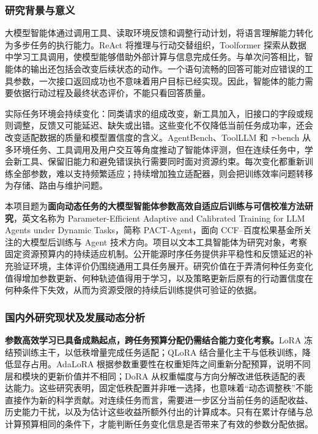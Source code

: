 \justifying
\NSFCBodyText

\subsubsection{研究背景与意义}

大模型智能体通过调用工具、读取环境反馈和调整行动计划，将语言理解能力转化为多步任务的执行能力。ReAct 将推理与行动交替组织，Toolformer 探索从数据中学习工具调用，使模型能够借助外部计算与信息完成任务\cite{react,toolformer}。与单次问答相比，智能体的输出还包括会改变后续状态的动作。一个语句流畅的回答可能对应错误的工具参数，一次接口返回成功也不意味着用户目标已经实现。因此，智能体的能力需要依据行动过程及最终状态评价，不能只看回答质量。

实际任务环境会持续变化：同类请求的组成改变，新工具加入，旧接口的字段或规则调整，反馈又可能延迟、缺失或出错。这些变化不仅降低当前任务成功率，还会改变适配数据的质量和模型置信度的含义。AgentBench、ToolLLM 和 $\tau$-bench 从多环境任务、工具调用及用户交互等角度推动了智能体评测\cite{agentbench,toolllm,taubench}，但在连续任务中，学会新工具、保留旧能力和避免错误执行需要同时面对资源约束。每次变化都重新训练全部参数，难以支持频繁适应；持续增加独立适配器，则会把训练效率问题转移为存储、路由与维护问题。

本项目题为\textbf{面向动态任务的大模型智能体参数高效自适应后训练与可信校准方法研究}，英文名称为 Parameter-Efficient Adaptive and Calibrated Training for LLM Agents under Dynamic Tasks，简称 PACT-Agent，面向 CCF--百度松果基金所关注的大模型后训练与 Agent 技术方向。项目以文本工具智能体为研究对象，考察固定资源预算内的持续适应机制。公开能源时序任务提供非平稳性和反馈延迟的补充验证环境，主体评价仍围绕通用工具任务展开。研究价值在于弄清何种任务变化值得增加参数更新、何种轨迹值得用于学习，以及策略更新后原有的行动置信度在何种条件下失效，从而为资源受限的持续后训练提供可验证的依据。

\subsubsection{国内外研究现状及发展动态分析}

\textbf{参数高效学习已具备成熟起点，跨任务预算分配仍需结合能力变化考察。}LoRA 冻结预训练主干，以低秩增量完成任务适配\cite{lora}；QLoRA 结合量化主干与低秩训练，降低显存占用\cite{qlora}。AdaLoRA 根据参数重要性在权重矩阵之间重新分配预算，说明不同层和模块的更新价值并不相同\cite{adalora}；DoRA 从权重幅度与方向分解改进低秩适配的表达能力\cite{dora}。这些研究表明，固定低秩配置并非唯一选择，也意味着“动态调整秩”不能直接作为新的科学贡献。对连续任务而言，需要进一步区分当前任务的适配收益、历史能力干扰，以及为估计这些收益所额外付出的计算成本。只有在累计存储与总计算预算相同的条件下，才能判断任务变化信息是否带来了有效的参数分配依据。

